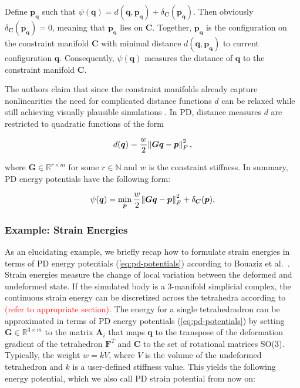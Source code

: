 \noindent Define $\bm{p_{\bm{q}}}$ such that $\psi({\bm{q}}) = d(\bm{q}, \bm{p_{\bm{q}}}) + \delta_{\bm{C}}(\bm{p_{\bm{q}}})$. Then obviously 
$\delta_{\bm{C}}(\bm{p_{\bm{q}}}) = 0$, meaning that $\bm{p_{\bm{q}}}$ lies on $\bm{C}$. Together, $\bm{p_{\bm{q}}}$ is the 
configuration on the constraint manifold $\bm{C}$ with minimal distance $d(\bm{q}, \bm{p_{\bm{q}}})$ to current configuration $\bm{q}$.
Consequently, $\psi(\bm{q})$ measures the distance of $\bm{q}$ to the constraint manifold $\bm{C}$.

The authors claim that since the constraint manifolds already capture nonlinearities the need for complicated distance functions $d$
can be relaxed while still achieving visually plausible simulations \cite{bouaziz2014}. In PD, distance measures $d$ are restricted to 
quadratic functions of the form

\begin{equation}\label{eq:pd-distance-measures}
    d(\bm{q}) = \frac{w}{2} \norm{\bm{Gq} - \bm{p}}^2_F,
\end{equation}

\noindent where $\bm{G} \in \mathbb{R}^{r \times m}$ for some $r \in \mathbb{N}$ and $w$ is the constraint stiffness. In summary, PD 
energy potentials have the following form:

\begin{equation}\label{eq:pd-potentials}
    \psi({\bm{q}}) = \min_{\bm{p}} \frac{w}{2} \norm{\bm{Gq} - \bm{p}}^2_F + \delta_{\bm{C}}(\bm{p}).
\end{equation}

\subsubsection{Example: Strain Energies}\label{sss:pd-strain}
As an elucidating example, we briefly recap how to formulate strain energies in terms of PD energy potentials 
(\cref{eq:pd-potentials}) according to Bouaziz et al.\ \cite{bouaziz2014}. Strain energies measure the change of local variation between 
the deformed and undeformed state. If the simulated body is a 3-manifold simplicial complex, the continuous strain energy can be 
discretized across the tetrahedra according to \textcolor{red}{(refer to appropriate section)}. The energy for a single tetrahedradron
can be approximated in terms of PD energy potentials (\cref{eq:pd-potentials}) by setting $\bm{G} \in \mathbb{R}^{3 \times m}$ to the 
matrix $\bm{A}_i$ that maps $\bm{q}$ to the transpose of the deformation gradient of the tetrahedron $\bm{F}^T$ and $\bm{C}$ to the 
set of rotational matrices SO(3). Typically, the weight $w = kV$, where $V$ is the volume of the undeformed tetrahedron and $k$ is a 
user-defined stiffness value. This yields the following energy potential, which we also call PD strain potential from now on:

